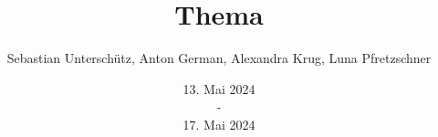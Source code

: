 \title{ Thema }
\author{Sebastian Unterschütz, Anton German, Alexandra Krug, Luna Pfretzschner}
\date{13. Mai 2024 \\ - \\ 17. Mai 2024}

\def\authliste{Anton German\\Alexandra Krug\\Luna Pfretzschner\\Sebastian Unterschütz}
\def\authheader{Sebastian Unterschütz, Anton German\\Alexandra Krug, Luna Pfretzschner}
\def\abgabetermin{17. Mai 2024}
\def\klasse{IT 232}